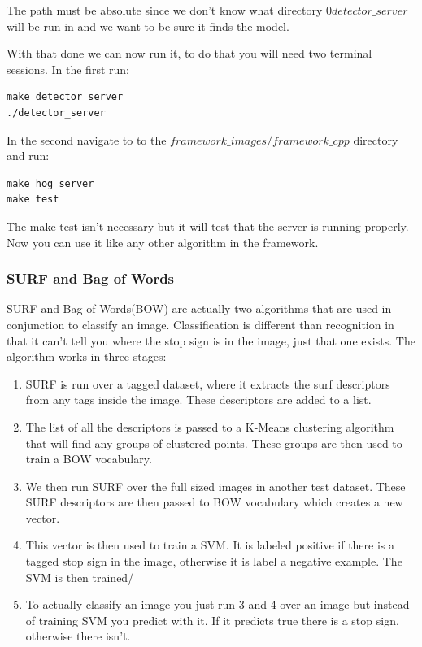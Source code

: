 \documentclass[letterpaper,10pt,titlepage]{article}
\begin{document}
The path must be absolute since we don't know what directory $0detector\_server$ will
be run in and we want to be sure it finds the model.

With that done we can now run it, to do that you will need two terminal sessions.
In the first run:
\begin{lstlisting}
make detector_server
./detector_server 
\end{lstlisting}

In the second navigate to to the $framework\_images/framework\_cpp$ directory and run:
\begin{lstlisting}
make hog_server
make test
\end{lstlisting}
The make test isn't necessary but it will test that the server is running properly.
Now you can use it like any other algorithm in the framework.

\subsubsection*{SURF and Bag of Words}
SURF and Bag of Words(BOW) are actually two algorithms that are used in conjunction to
classify an image. Classification is different than recognition in that it can't tell 
you where the stop sign is in the image, just that one exists. The algorithm works
in three stages:
\begin{enumerate}
    \item SURF is run over a tagged dataset, where it extracts the surf descriptors
        from any tags inside the image. These descriptors are added to a list.
    \item The list of all the descriptors is passed to a K-Means clustering algorithm
        that will find any groups of clustered points. These groups are then used to
        train a BOW vocabulary.
    \item We then run SURF over the full sized images in another test dataset. These
        SURF descriptors are then passed to BOW vocabulary which creates a new vector.
    \item This vector is then used to train a SVM. It is labeled positive if there is
        a tagged stop sign in the image, otherwise it is label a negative example. The
        SVM is then trained/
    \item To actually classify an image you just run 3 and 4 over an image but instead
        of training SVM you predict with it. If it predicts true there is a stop sign,
        otherwise there isn't.
\end{enumerate}
\end{document}
